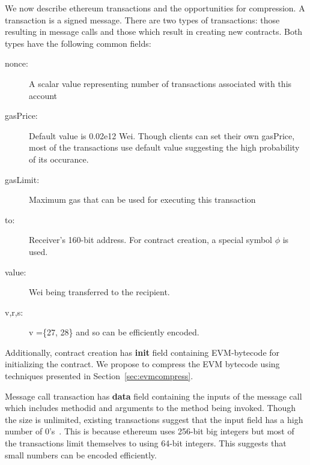 We now describe ethereum transactions and the opportunities for compression.
A transaction is a signed message.
There are two types of transactions: those resulting in message calls and those which result in creating new contracts.
Both types have the following common fields:
\begin{description}
  \item[nonce:] A scalar value representing number of transactions associated with this account
  \item[gasPrice:] Default value is 0.02e12 Wei. Though clients can set their own gasPrice, most of the transactions use default value suggesting the high probability of its occurance.
  \item[gasLimit:] Maximum gas that can be used for executing this transaction
  \item[to:] Receiver's 160-bit address. For contract creation, a special symbol $\phi$ is used.
  \item[value:] Wei being transferred to the recipient.
  \item[v,r,s:] v =\{27, 28\} and so can be efficiently encoded.
\end{description}

Additionally, contract creation has \textbf{init} field containing EVM-bytecode for initializing the contract.
We propose to compress the EVM bytecode using techniques presented in Section~\ref{sec:evmcompress}. 

Message call transaction has \textbf{data} field containing the inputs of the message call which includes methodid and arguments to the method being invoked.
Though the size is unlimited, existing transactions suggest that the input field has a high number of 0's~\cite{ethtx}. 
This is because ethereum uses 256-bit big integers but most of the transactions limit themselves to using 64-bit integers. 
This suggests that small numbers can be encoded efficiently.


%

